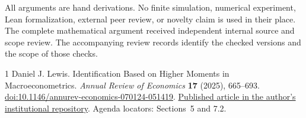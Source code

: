 \documentclass[11pt,a4paper]{article}
\numberwithin{equation}{section}
\begin{document}
All arguments are hand derivations. No finite simulation, numerical
experiment, Lean formalization, external peer review, or novelty claim
is used in their place. The complete mathematical argument received
independent internal source and scope review. The accompanying review
records identify the checked versions and the scope of those checks.

\begin{thebibliography}{1}
Daniel J. Lewis.
\newblock Identification Based on Higher Moments in Macroeconometrics.
\newblock \emph{Annual Review of Economics} \textbf{17} (2025), 665--693.
\newblock \href{https://doi.org/10.1146/annurev-economics-070124-051419}
{doi:10.1146/annurev-economics-070124-051419}.
\newblock \href{https://discovery.ucl.ac.uk/id/eprint/10208055/1/Lewis_annurev-economics-070124-051419.pdf}
{Published article in the author's institutional repository}.
\newblock Agenda locators: Sections~5 and 7.2.
\end{thebibliography}
\end{document}
